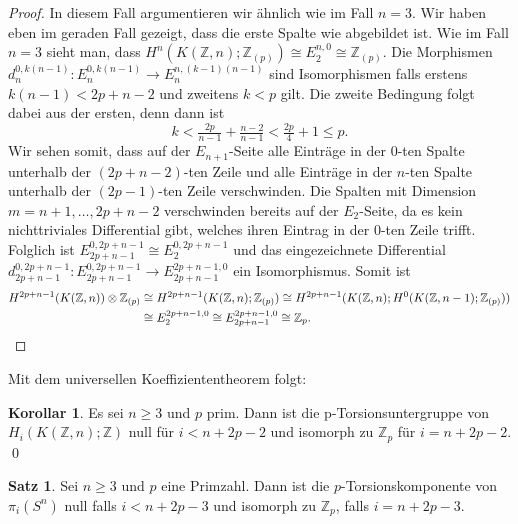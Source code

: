 \documentclass[11pt, a4paper, german]{article}
\theoremstyle{definition}
\newtheorem{satz}[lem]{Satz}
\newtheorem{kor}[lem]{Korollar}
\theoremstyle{remark}
\newcommand{\Z}{\mathbb{Z}} %
\begin{document}
\begin{proof}
  In diesem Fall argumentieren wir ähnlich wie im Fall $n = 3$.
  Wir haben eben im geraden Fall gezeigt, dass die erste Spalte wie abgebildet ist.
  Wie im Fall $n = 3$ sieht man, dass $H^n(K(\Z, n); \Z_{(p)}) \cong E_2^{n,0} \cong \Z_{(p)}$.
  Die Morphismen $d_n^{0,k (n-1)} : E_n^{0, k (n-1)} \to E_n^{n, (k-1) (n-1)}$ sind Isomorphismen falls erstens $k (n-1) < 2p + n - 2$ und zweitens $k < p$ gilt.
  Die zweite Bedingung folgt dabei aus der ersten, denn dann ist
  \[ k < \tfrac{2p}{n-1} + \tfrac{n - 2}{n-1} < \tfrac{2p}{4} + 1 \leq p. \]
  Wir sehen somit, dass auf der $E_{n+1}$-Seite alle Einträge in der $0$-ten Spalte unterhalb der $(2p + n - 2)$-ten Zeile und alle Einträge in der $n$-ten Spalte unterhalb der $(2p - 1)$-ten Zeile verschwinden.
  Die Spalten mit Dimension $m = n+1, \ldots, 2p + n - 2$ verschwinden bereits auf der $E_2$-Seite, da es kein nichttriviales Differential gibt, welches ihren Eintrag in der $0$-ten Zeile trifft.
  Folglich ist $E_{2p + n - 1}^{0, 2p + n - 1} \cong E_{2}^{0, 2p + n - 1}$ und das eingezeichnete Differential $d_{2p + n - 1}^{0, 2p + n - 1} : E_{2p + n - 1}^{0, 2p + n - 1} \to E_{2p + n - 1}^{2p + n - 1, 0}$ ein Isomorphismus.
  Somit ist
  \begin{align*}
    H^{2p + n - 1}(K(\Z, n)) \otimes \Z_{(p)} & \cong H^{2p + n - 1}(K(\Z, n); \Z_{(p)}) \cong H^{2p + n - 1}(K(\Z, n); H^0(K(\Z, n-1); \Z_{(p)})) \\
    & \cong E_2^{2p + n - 1, 0} \cong E_{2p + n - 1}^{2p + n - 1, 0} \cong \Z_p. \qedhere
  \end{align*}
\end{proof}

Mit dem universellen Koeffiziententheorem folgt:

\begin{kor}\label{mod-p-homology-kzn}
  Es sei $n \geq 3$ und $p$ prim.
  Dann ist die p-Torsionsuntergruppe von $H_i(K(\Z, n); \Z)$ null für $i < n + 2p - 2$ und isomorph zu $\Z_p$ für $i = n + 2p - 2$. \qed
\end{kor}

\begin{satz}
  Sei $n \geq 3$ und $p$ eine Primzahl.
  Dann ist die $p$-Torsionskomponente von $\pi_i(S^n)$ null falls $i < n + 2p - 3$ und isomorph zu $\Z_p$, falls $i = n + 2p - 3$.
\end{satz}
\end{document}
